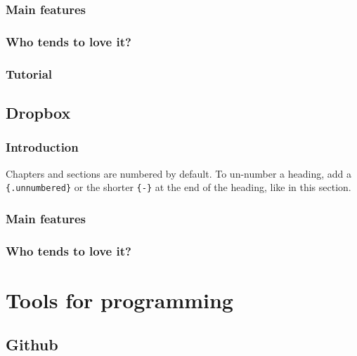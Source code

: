 \documentclass[
]{book}
\begin{document}
\hypertarget{main-features}{%
\subsection{Main features}\label{main-features}}

\hypertarget{who-tends-to-love-it}{%
\subsection{Who tends to love it?}\label{who-tends-to-love-it}}

\hypertarget{tutorial}{%
\subsection{Tutorial}\label{tutorial}}

\hypertarget{dropbox}{%
\section{Dropbox}\label{dropbox}}

\hypertarget{introduction-2}{%
\subsection{Introduction}\label{introduction-2}}

Chapters and sections are numbered by default. To un-number a heading, add a \texttt{\{.unnumbered\}} or the shorter \texttt{\{-\}} at the end of the heading, like in this section.

\hypertarget{main-features-1}{%
\subsection{Main features}\label{main-features-1}}

\hypertarget{who-tends-to-love-it-1}{%
\subsection{Who tends to love it?}\label{who-tends-to-love-it-1}}

\hypertarget{tools-for-programming}{%
\chapter{Tools for programming}\label{tools-for-programming}}

\hypertarget{github}{%
\section{Github}\label{github}}
\end{document}
